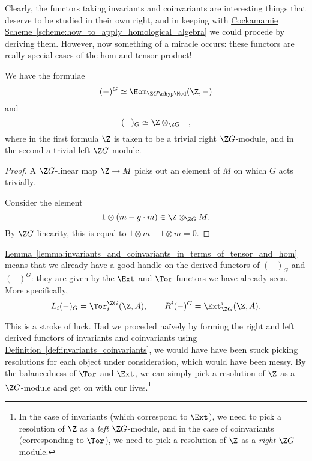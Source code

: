 \documentclass[main.tex]{subfiles}
\begin{document}
Clearly, the functors taking invariants and coinvariants are interesting things that deserve to be studied in their own right, and in keeping with \hyperref[scheme:how_to_apply_homological_algebra]{Cockamamie Scheme~\ref*{scheme:how_to_apply_homological_algebra}} we could procede by deriving them. However, now something of a miracle occurs: these functors are really special cases of the hom and tensor product!

\begin{lemma}
  \label{lemma:invariants_and_coinvariants_in_terms_of_tensor_and_hom}
  We have the formulae
  \begin{equation*}
    (-)^{G} \simeq \Hom_{\Z G\mhyp\Mod}(\Z, -)
  \end{equation*}
  and
  \begin{equation*}
    (-)_{G} \simeq \Z \otimes_{\Z G} -,
  \end{equation*}
  where in the first formula $\Z$ is taken to be a trivial right $\Z G$-module, and in the second a trivial left $\Z G$-module.
\end{lemma}
\begin{proof}
  A $\Z G$-linear map $\Z \to M$ picks out an element of $M$ on which $G$ acts trivially.

  Consider the element
  \begin{equation*}
    1 \otimes(m - g\cdot m) \in \Z \otimes_{\Z G} M.
  \end{equation*}
  By $\Z G$-linearity, this is equal to $1 \otimes m - 1 \otimes m = 0$.
\end{proof}

\hyperref[lemma:invariants_and_coinvariants_in_terms_of_tensor_and_hom]{Lemma~\ref*{lemma:invariants_and_coinvariants_in_terms_of_tensor_and_hom}} means that we already have a good handle on the derived functors of $(-)_{G}$ and $(-)^{G}$: they are given by the $\Ext$ and $\Tor$ functors we have already seen. More specifically,
\begin{equation*}
  L_{i}(-)_{G} = \Tor^{\Z G}_{i}(\Z, A),\qquad R^{i}(-)^{G} = \Ext_{\Z G}^{i}(\Z, A).
\end{equation*}

This is a stroke of luck. Had we proceded naïvely by forming the right and left derived functors of invariants and coinvariants using \hyperref[def:invariants_coinvariants]{Definition~\ref*{def:invariants_coinvariants}}, we would have have been stuck picking resolutions for each object under consideration, which would have been messy. By the balancedness of $\Tor$ and $\Ext$, we can simply pick a resolution of $\Z$ as a $\Z G$-module and get on with our lives.\footnote{In the case of invariants (which correspond to $\Ext$), we need to pick a resolution of $\Z$ as a \emph{left} $\Z G$-module, and in the case of coinvariants (corresponding to $\Tor$), we need to pick a resolution of $\Z$ as a \emph{right} $\Z G$-module.}
\end{document}

